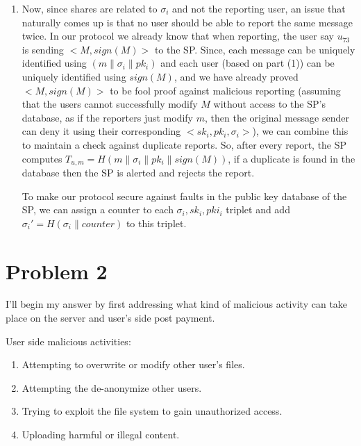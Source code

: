 \documentclass{ashoka-crypto}
\begin{document}
\begin{enumerate}
\item Now, since shares are related to $\sigma_i$ and not the reporting user, an issue that naturally comes up is that no user should be able to report the same message twice. In our protocol we already know that when reporting, the user say $u_{73}$ is sending $<M,sign(M)>$ to the SP. Since, each message can be uniquely identified using $(m \| \sigma_i \| pk_i)$ and each user (based on part (1)) can be uniquely identified using $sign(M)$, and we have already proved $<M, sign(M)>$ to be fool proof against malicious reporting (assuming that the users cannot successfully modify $M$ without access to the SP's database, as if the reporters just modify $m$, then the original message sender can deny it using their corresponding $<sk_i,pk_i,\sigma_i>$), we can combine this to maintain a check against duplicate reports. So, after every report, the SP computes $T_{u,m} = H(m \| \sigma_i \| pk_i \| sign(M))$, if a duplicate is found in the database then the SP is alerted and rejects the report. 

To make our protocol secure against faults in the public key database of the SP, we can assign a counter to each $\sigma_i, sk_i,pki_i$ triplet and add $\sigma_i' = H(\sigma_i \| counter)$ to this triplet.

\end{enumerate}

\clearpage

\section*{Problem 2}
I'll begin my answer by first addressing what kind of malicious activity can take place on the server and user's side post payment.

User side malicious activities:
\begin{enumerate}
\item Attempting to overwrite or modify other user's files.

\item Attempting the de-anonymize other users.

\item Trying to exploit the file system to gain unauthorized access.

\item Uploading harmful or illegal content. 

\end{enumerate}
\end{document}
